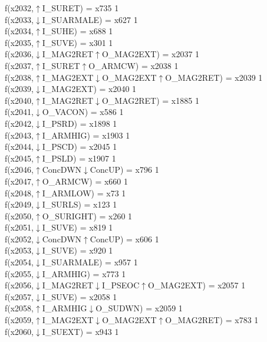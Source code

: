 f(x2032,$\uparrow$I\_SURET) = x735 {1} \\
f(x2033,$\downarrow$I\_SUARMALE) = x627 {1} \\
f(x2034,$\uparrow$I\_SUHE) = x688 {1} \\
f(x2035,$\uparrow$I\_SUVE) = x301 {1} \\
f(x2036,$\downarrow$I\_MAG2RET$\uparrow$O\_MAG2EXT) = x2037 {1} \\
f(x2037,$\uparrow$I\_SURET$\uparrow$O\_ARMCW) = x2038 {1} \\
f(x2038,$\uparrow$I\_MAG2EXT$\downarrow$O\_MAG2EXT$\uparrow$O\_MAG2RET) = x2039 {1} \\
f(x2039,$\downarrow$I\_MAG2EXT) = x2040 {1} \\
f(x2040,$\uparrow$I\_MAG2RET$\downarrow$O\_MAG2RET) = x1885 {1} \\
f(x2041,$\downarrow$O\_VACON) = x586 {1} \\
f(x2042,$\downarrow$I\_PSRD) = x1898 {1} \\
f(x2043,$\uparrow$I\_ARMHIG) = x1903 {1} \\
f(x2044,$\downarrow$I\_PSCD) = x2045 {1} \\
f(x2045,$\uparrow$I\_PSLD) = x1907 {1} \\
f(x2046,$\uparrow$ConcDWN$\downarrow$ConcUP) = x796 {1} \\
f(x2047,$\uparrow$O\_ARMCW) = x660 {1} \\
f(x2048,$\uparrow$I\_ARMLOW) = x73 {1} \\
f(x2049,$\downarrow$I\_SURLS) = x123 {1} \\
f(x2050,$\uparrow$O\_SURIGHT) = x260 {1} \\
f(x2051,$\downarrow$I\_SUVE) = x819 {1} \\
f(x2052,$\downarrow$ConcDWN$\uparrow$ConcUP) = x606 {1} \\
f(x2053,$\downarrow$I\_SUVE) = x920 {1} \\
f(x2054,$\downarrow$I\_SUARMALE) = x957 {1} \\
f(x2055,$\downarrow$I\_ARMHIG) = x773 {1} \\
f(x2056,$\downarrow$I\_MAG2RET$\downarrow$I\_PSEOC$\uparrow$O\_MAG2EXT) = x2057 {1} \\
f(x2057,$\downarrow$I\_SUVE) = x2058 {1} \\
f(x2058,$\uparrow$I\_ARMHIG$\downarrow$O\_SUDWN) = x2059 {1} \\
f(x2059,$\uparrow$I\_MAG2EXT$\downarrow$O\_MAG2EXT$\uparrow$O\_MAG2RET) = x783 {1} \\
f(x2060,$\downarrow$I\_SUEXT) = x943 {1} \\
